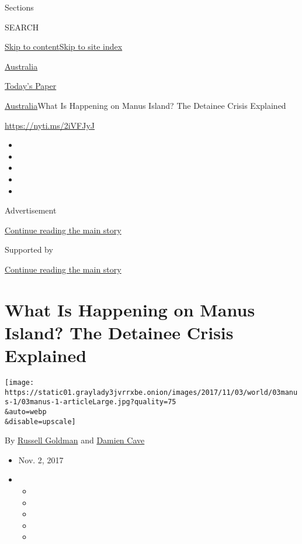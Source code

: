 Sections

SEARCH

\protect\hyperlink{site-content}{Skip to
content}\protect\hyperlink{site-index}{Skip to site index}

\href{https://www.nytimes3xbfgragh.onion/section/world/australia}{Australia}

\href{https://myaccount.nytimes3xbfgragh.onion/auth/login?response_type=cookie\&client_id=vi}{}

\href{https://www.nytimes3xbfgragh.onion/section/todayspaper}{Today's
Paper}

\href{/section/world/australia}{Australia}\textbar{}What Is Happening on
Manus Island? The Detainee Crisis Explained

\href{https://nyti.ms/2iVFJyJ}{https://nyti.ms/2iVFJyJ}

\begin{itemize}
\item
\item
\item
\item
\item
\end{itemize}

Advertisement

\protect\hyperlink{after-top}{Continue reading the main story}

Supported by

\protect\hyperlink{after-sponsor}{Continue reading the main story}

\hypertarget{what-is-happening-on-manus-island-the-detainee-crisis-explained}{%
\section{What Is Happening on Manus Island? The Detainee Crisis
Explained}\label{what-is-happening-on-manus-island-the-detainee-crisis-explained}}

\texttt{[image: https://static01.graylady3jvrrxbe.onion/images/2017/11/03/world/03manus-1/03manus-1-articleLarge.jpg?quality=75\\\&auto=webp\\\&disable=upscale]}

By \href{http://www.nytimes3xbfgragh.onion/by/russell-goldman}{Russell
Goldman} and
\href{http://www.nytimes3xbfgragh.onion/by/damien-cave}{Damien Cave}

\begin{itemize}
\item
  Nov. 2, 2017
\item
  \begin{itemize}
  \item
  \item
  \item
  \item
  \item
  \end{itemize}
\end{itemize}

